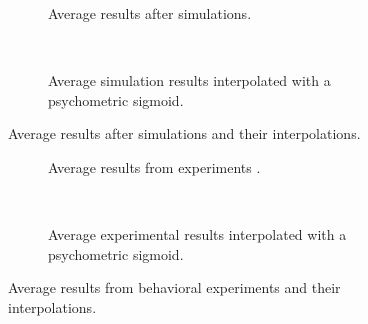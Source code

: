 \newpage

\begin{multicols}{2}

\begin{figure}[H]
     \centering
    \begin{subfigure}[t]{0.41\textwidth}
        \centering
        
        \vspace{-\baselineskip}
        \caption{Average results after simulations.}
        \label{fig:sim-res}
    \end{subfigure}
    \\ \vspace{\baselineskip}
    \begin{subfigure}[t]{0.41\textwidth}
        \centering
        
        \vspace{-\baselineskip}
        \caption{Average simulation results interpolated with a psychometric sigmoid.}
        \label{fig:sim-res-sigmoid}
    \end{subfigure}
    \caption[Simulation results]{Average results after simulations and their interpolations.}
    \label{fig:all-sim-res}
\end{figure}

\columnbreak

\begin{figure}[H]
     \centering
    \begin{subfigure}[t]{0.41\textwidth}
        \centering
        
        \vspace{-\baselineskip}
        \caption{Average results from experiments \cite{MaryamPLACEHOLDER}.}
        \label{fig:exp-res}
    \end{subfigure}
    \\ \vspace{\baselineskip}
    \begin{subfigure}[t]{0.41\textwidth}
        \centering
        
        \vspace{-\baselineskip}
        \caption{Average experimental results interpolated with a psychometric sigmoid.}
        \label{fig:exp-res-sigmoid}
    \end{subfigure}
    \caption[Experimental results]{Average results from behavioral experiments and their interpolations.}
    \label{fig:all-exp-res}
\end{figure}

\end{multicols}

